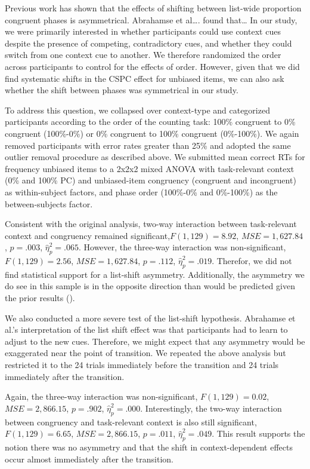 \documentclass[english,,man,floatsintext]{apa6}
\begin{document}
Previous work has shown that the effects of shifting between list-wide proportion congruent phases is asymmetrical. Abrahamse et al\ldots{}. found that\ldots{} In our study, we were primarily interested in whether participants could use context cues despite the presence of competing, contradictory cues, and whether they could switch from one context cue to another. We therefore randomized the order across participants to control for the effects of order. However, given that we did find systematic shifts in the CSPC effect for unbiased items, we can also ask whether the shift between phases was symmetrical in our study.

To address this question, we collapsed over context-type and categorized participants according to the order of the counting task: 100\% congruent to 0\% congruent (100\%-0\%) or 0\% congruent to 100\% congruent (0\%-100\%). We again removed participants with error rates greater than 25\% and adopted the same outlier removal procedure as described above. We submitted mean correct RTs for frequency unbiased items to a 2x2x2 mixed ANOVA with task-relevant context (0\% and 100\% PC) and unbiased-item congruency (congruent and incongruent) as within-subject factors, and phase order (100\%-0\% and 0\%-100\%) as the between-subjects factor.

Consistent with the original analysis, two-way interaction between task-relevant context and congruency remained significant,\(F(1, 129) = 8.92\), \(\mathit{MSE} = 1,627.84\), \(p = .003\), \(\hat{\eta}^2_p = .065\). However, the three-way interaction was non-significant, \(F(1, 129) = 2.56\), \(\mathit{MSE} = 1,627.84\), \(p = .112\), \(\hat{\eta}^2_p = .019\). Therefor, we did not find statistical support for a list-shift asymmetry. Additionally, the asymmetry we do see in this sample is in the opposite direction than would be predicted given the prior results ().

We also conducted a more severe test of the list-shift hypothesis. Abrahamse et al.'s interpretation of the list shift effect was that participants had to learn to adjust to the new cues. Therefore, we might expect that any asymmetry would be exaggerated near the point of transition. We repeated the above analysis but restricted it to the 24 trials immediately before the transition and 24 trials immediately after the transition.

Again, the three-way interaction was non-significant, \(F(1, 129) = 0.02\), \(\mathit{MSE} = 2,866.15\), \(p = .902\), \(\hat{\eta}^2_p = .000\). Interestingly, the two-way interaction between congruency and task-relevant context is also still significant, \(F(1, 129) = 6.65\), \(\mathit{MSE} = 2,866.15\), \(p = .011\), \(\hat{\eta}^2_p = .049\). This result supports the notion there was no asymmetry and that the shift in context-dependent effects occur almost immediately after the transition.
\end{document}
